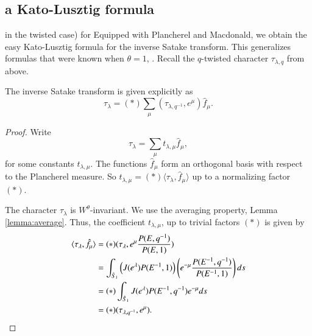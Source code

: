 \subsection{a Kato-Lusztig formula}

\cite{kato1982spherical} \cite{lusztig1983singularities} in the twisted case) for 
Equipped with Plancherel and Macdonald, we obtain the easy Kato-Lusztig formula for the inverse Satake transform.
This generalizes formulas that were known when $\theta=1$, \cite{kato1982spherical} \cite{lusztig1983singularities}.
Recall the $q$-twisted character  $\tau_{\lambda,q}$ from above.

\begin{theorem}
The inverse Satake transform is given explicitly as
\[
\tau_\lambda = (*)\sum_\mu (\tau_{\lambda,q^{-1}},e^\mu)  \hat f_\mu.
\]
\end{theorem}

\begin{proof}
Write 
\[
\tau_\lambda = \sum_\mu t_{\lambda,\mu}  \hat f_\mu,
\]
for some constants $t_{\lambda,\mu}$.
The functions $\hat f_\mu$ form an orthogonal basis with respect to the Plancherel measure.
So $t_{\lambda,\mu} = (*) \langle\tau_\lambda,\hat f_\mu\rangle$ up to a normalizing factor $(*)$.

The character $\tau_\lambda$ is $W^\theta$-invariant. 
We use the averaging property, Lemma \ref{lemma:average}.
Thus, the coefficient $t_{\lambda,\mu}$, up to trivial factors $(*)$ is given by
\begin{align*}
\langle{\tau_\lambda,\hat f_\mu}\rangle
&=(*)(\tau_\lambda,e^\mu \frac{P(E,q^{-1})}{P(E,1)})\\
&=\int_{\hat S_1} \left(J(e^\lambda) P(E^{-1},1)\right) \left( e^{-\mu}\frac{P(E^{-1},q^{-1})}{P(E^{-1},1)} \right) ds\\
&=
(*)\int_{\hat S_1} J(e^\lambda) P(E^{-1},q^{-1}) e^{-\mu} ds\\
&=(*)(\tau_{\lambda,q^{-1}},e^\mu).
\end{align*}
\end{proof}



